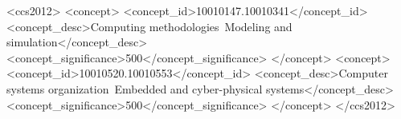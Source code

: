 \begin{CCSXML}
<ccs2012>
    <concept>
        <concept_id>10010147.10010341</concept_id>
        <concept_desc>Computing methodologies~Modeling and simulation</concept_desc>
        <concept_significance>500</concept_significance>
    </concept>
    <concept>
        <concept_id>10010520.10010553</concept_id>
        <concept_desc>Computer systems organization~Embedded and cyber-physical systems</concept_desc>
        <concept_significance>500</concept_significance>
    </concept>
</ccs2012>
\end{CCSXML}

